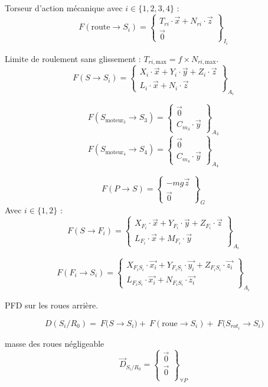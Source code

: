 \documentclass[a4paper,12pt]{report}  %
\begin{document}
Torseur d'action mécanique avec $i \in \{1,2,3,4\}$ : 
$$
F(\text{route} \to S_i) = 
\begin{Bmatrix}
	T_{ri} \cdot \vec{x} + N_{ri} \cdot \vec{z} 
	\\
	\vec0
\end{Bmatrix}_{I_{i}}
$$

Limite de roulement sans glissement : $T_{ri,\text{max}} = f \times N_{ri, \text{max}}$. 
$$
F(S \to S_i) = 
\begin{Bmatrix}
	X_i \cdot \vec{x} + Y_i \cdot \vec{y} + Z_i \cdot \vec{z} \\
	L_i \cdot \vec{x} + N_i \cdot \vec{z}
\end{Bmatrix}_{A_{i}}
$$


$$
F(S_{\text{moteur}_3}\to S_3) = 
\begin{Bmatrix}
	\vec{0} \\
	C_{m_3} \cdot \vec{y} 
\end{Bmatrix}_{A_{3}}
$$
$$
F(S_{\text{moteur}_4}\to S_4) = 
\begin{Bmatrix}
	\vec{0} \\
	C_{m_4} \cdot \vec{y} 
\end{Bmatrix}_{A_{4}}
$$

$$
F(P \to S) = 
\begin{Bmatrix}
	-mg\vec{z} \\
	\vec0 
\end{Bmatrix}_{G}
$$
Avec $i \in \{1,2\}$ : 
$$
F(S \to F_i) = 
\begin{Bmatrix}
	X_{F_i} \cdot \vec{x} + Y_{F_i} \cdot \vec{y} + Z_{F_i} \cdot \vec{z} \\
	L_{F_i} \cdot \vec{x} + M_{F_i} \cdot \vec{y}
\end{Bmatrix}_{A_{i}}
$$

$$
F(F_i \to S_i) = 
\begin{Bmatrix}
	X_{F_i S_i} \cdot \vec{x_i} + Y_{F_i S_i} \cdot \vec{y_i} + Z_{F_i S_i} \cdot \vec{z_i} \\
	L_{F_i S_i} \cdot \vec{x_i} + N_{F_i S_i} \cdot \vec{z_i}
\end{Bmatrix}_{A_{i}}
$$



PFD sur les roues arrière. 

$$\ {D}({S_i/R_0}) = \ {F}({S \rightarrow S_i)} + \ {F}{(\text{roue} \rightarrow S_i)} + \ {F} ({S_{rot_i}\rightarrow S_i)}$$

masse des roues négligeable $$\vec{D}_{S_i/R_0} = \begin{Bmatrix}
	\vec{0} \\
	\vec{0}\\ \end{Bmatrix}_{\forall P}$$
\end{document}
